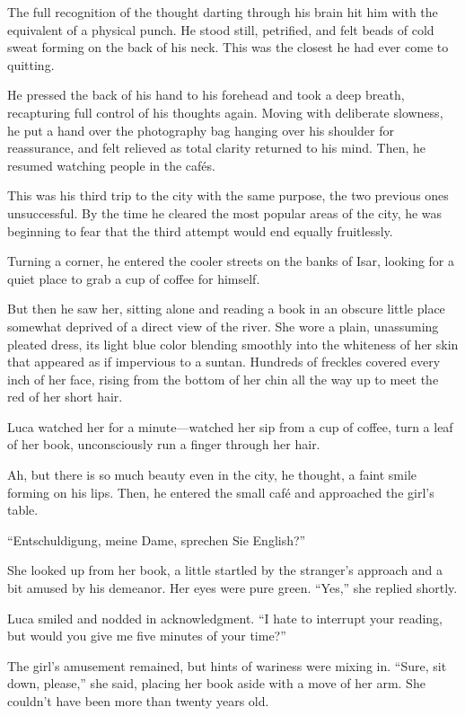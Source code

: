 The full recognition of the thought darting through his brain hit him with the equivalent of a physical punch. He stood still, petrified, and felt beads of cold sweat forming on the back of his neck. This was the closest he had ever come to quitting.

He pressed the back of his hand to his forehead and took a deep breath, recapturing full control of his thoughts again. Moving with deliberate slowness, he put a hand over the photography bag hanging over his shoulder for reassurance, and felt relieved as total clarity returned to his mind. Then, he resumed watching people in the cafés.

This was his third trip to the city with the same purpose, the two previous ones unsuccessful. By the time he cleared the most popular areas of the city, he was beginning to fear that the third attempt would end equally fruitlessly.

Turning a corner, he entered the cooler streets on the banks of Isar, looking for a quiet place to grab a cup of coffee for himself.

But then he saw her, sitting alone and reading a book in an obscure little place somewhat deprived of a direct view of the river. She wore a plain, unassuming pleated dress, its light blue color blending smoothly into the whiteness of her skin that appeared as if impervious to a suntan. Hundreds of freckles covered every inch of her face, rising from the bottom of her chin all the way up to meet the red of her short hair.

Luca watched her for a minute---watched her sip from a cup of coffee, turn a leaf of her book, unconsciously run a finger through her hair.

Ah, but there is so much beauty even in the city, he thought, a faint smile forming on his lips. Then, he entered the small café and approached the girl's table.


``Entschuldigung, meine Dame, sprechen Sie English?''


She looked up from her book, a little startled by the stranger's approach and a bit amused by his demeanor. Her eyes were pure green. ``Yes,'' she replied shortly.

Luca smiled and nodded in acknowledgment. ``I hate to interrupt your reading, but would you give me five minutes of your time?''

The girl's amusement remained, but hints of wariness were mixing in. ``Sure, sit down, please,'' she said, placing her book aside with a move of her arm. She couldn't have been more than twenty years old.

